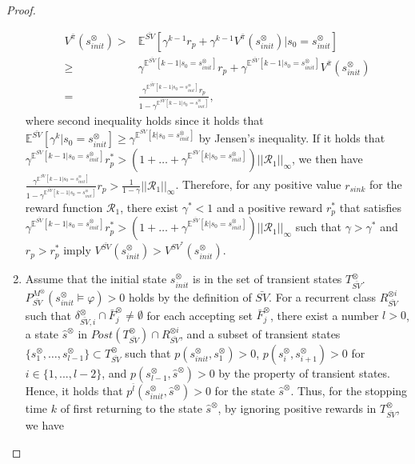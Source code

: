 \documentclass[10pt]{article}
\theoremstyle{definition}
\begin{document}
\begin{proof}
\begin{enumerate}
    \begin{align}
      V^{\bar{\pi}}(s^{\otimes}_{init})
       > & \mathbb{E}^{\bar{SV}} [ \gamma^{k-1} r_p + \gamma^{k-1} V^{\bar{\pi}}(s^{\otimes}_{init}) | s_0 = s^{\otimes}_{init} ] \nonumber \\
       \geq & \gamma^{\mathbb{E}^{\bar{SV}}[k - 1 | s_0 = s^{\otimes}_{init} ]} r_p + \gamma^{\mathbb{E}^{\bar{SV}}[ k - 1 | s_0 = s^{\otimes}_{init} ]} V^{\bar{\pi}}(s^{\otimes}_{init}) \nonumber \\
       = & \frac{ \gamma^{\mathbb{E}^{\bar{SV}}[k - 1 | s_0 = s^{\otimes}_{init} ]} r_p } { 1 - \gamma^{\mathbb{E}^{\bar{SV}}[k - 1 | s_0 = s^{\otimes}_{init} ]}}, \nonumber
    \end{align}
 where second inequality holds since it holds that $\mathbb{E}^{\bar{SV}} [ \gamma^k | s_0 = s^{\otimes}_{init} ] \geq \gamma^{\mathbb{E}^{\bar{SV}}[k | s_0 = s^{\otimes}_{init} ]}$ by Jensen's inequality. If it holds that $\gamma^{\mathbb{E}^{\bar{SV}}[k - 1 | s_0 = s^{\otimes}_{init} ]} r^{\ast}_p > (1 + \ldots + \gamma^{\mathbb{E}^{\bar{SV}}[k | s_0 = s^{\otimes}_{init} ]} ) ||\mathcal{R}_1||_{\infty}$, we then have $ \frac{ \gamma^{\mathbb{E}^{\bar{SV}}[k - 1 | s_0 = s^{\otimes}_{init} ]} } { 1 - \gamma^{\mathbb{E}^{\bar{SV}}[k - 1 | s_0 = s^{\otimes}_{init} ]}} r_p > \frac{1}{1-\gamma} ||\mathcal{R}_1||_{\infty}$.
  Therefore, for any positive value $r_{sink}$ for the reward function $\mathcal{R}_1$, there exist $\gamma^{\ast} < 1$ and a positive reward $r^{\ast}_p$ that satisfies $\gamma^{\mathbb{E}^{\bar{SV}}[k - 1 | s_0 = s^{\otimes}_{init} ]} r^{\ast}_p > (1 + \ldots + \gamma^{\mathbb{E}^{\bar{SV}}[k | s_0 = s^{\otimes}_{init} ]} ) ||\mathcal{R}_1||_{\infty}$ such that $\gamma > \gamma^{\ast} $ and $r_p > r^{\ast}_p$ imply $V^{\bar{SV}}(s^{\otimes}_{init}) > V^{SV^{\ast}}(s^{\otimes}_{init})$.

  \item Assume that the initial state $s^{\otimes}_{init}$ is in the set of transient states $T_{\bar{SV}}^{\otimes}$.$P^{M^{\otimes}}_{\bar{SV}}(s^{\otimes}_{init} \models \varphi) > 0$ holds by the definition of $\bar{SV}$. For a recurrent class $R^{\otimes i}_{\bar{SV}}$ such that $\delta^{\otimes}_{\bar{SV}, i} \cap \bar{F}^{\otimes}_j \neq \emptyset$ for each accepting set
    $\bar{F}^{\otimes}_j$, there exist a number $l > 0$, a state $\hat{s}^{\otimes}$ in $Post(T^{\otimes}_{\bar{SV}}) \cap R^{\otimes i}_{\bar{SV}}$, and a subset of transient states $\{ s^{\otimes}_1, \ldots , s^{\otimes}_{l-1} \} \subset T^{\otimes}_{\bar{SV}}$ such that $p(s^{\otimes}_{init}, s^{\otimes}_1)>0$, $p(s^{\otimes}_{i}, s^{\otimes}_{i+1})>0$ for $i \in \{ 1,...,l-2 \}$, and $p(s^{\otimes}_{l-1}, \hat{s}^{\otimes})>0$ by the property of transient states.
    Hence, it holds that $p^{\bar{l}}(s^{\otimes}_{init}, \hat{s}^{\otimes}) > 0$ for the state $\hat{s}^{\otimes}$. Thus, for the stopping time $k$ of first returning to the state $\hat{s}^{\otimes}$, by ignoring positive rewards in $T^{\otimes}_{\bar{SV}}$, we have


\end{enumerate}
\end{proof}
\end{document}
